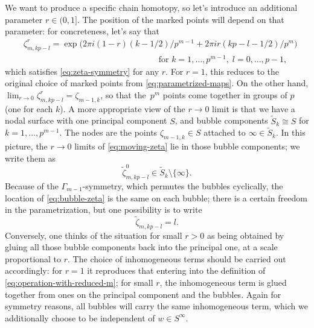 \documentclass[10pt,a4paper]{amsart}
\theoremstyle{plain}
\theoremstyle{definition}
\let\iso\cong
\begin{document}
We want to produce a specific chain homotopy, so let's introduce an additional parameter $r \in (0,1]$. The position of the marked points will depend on that parameter: for concreteness, let's say that\enlargethispage{-\baselineskip}
\begin{equation}\label{eq:moving-zeta}
\begin{aligned}
&\zeta_{m,kp-l}^r = \exp\bigl(2\pi i (1-r) (k-1/2)/p^{m-1} + 2\pi i r (kp-l-1/2)/p^m \bigr)
\\
& \qquad \qquad \qquad \qquad \qquad \qquad \qquad \qquad \text{for } k = 1,\dots,p^{m-1}, \; l = 0,\dots,p-1,
\end{aligned}
\end{equation}
which satisfies \eqref{eq:zeta-symmetry} for any $r$. For $r = 1$, this reduces to the original choice of marked points from \eqref{eq:parametrized-maps}. On the other hand, $\lim_{r \to 0} \zeta_{m,kp-l}^r = \zeta_{m-1,k}$, so that the~$p^m$ points come together in groups of $p$ (one for each $k$). A more appropriate view of the $r \to 0$ limit is that we have a nodal surface with one principal component $S$, and bubble components $\tilde{S}_k \iso S$ for $k = 1,\dots,p^{m-1}$. The nodes are the points $\zeta_{m-1,k} \in S$ attached to $\infty \in \tilde{S}_k$. In this picture, the $r \to 0$ limits of \eqref{eq:moving-zeta} lie in those bubble components; we write them as
\begin{equation}\label{eq:bubble-zeta}
\tilde\zeta_{m,kp-l}^0 \in \tilde{S}_k \setminus \{\infty\}.
\end{equation}
Because of the $\Gamma_{m-1}$-symmetry, which permutes the bubbles cyclically, the location of \eqref{eq:bubble-zeta} is the same on each bubble; there is a certain freedom in the parametrization, but one possibility is to write
\begin{equation}\label{eq:bubble-points}
\tilde\zeta_{m,kp-l} = l.
\end{equation}
Conversely, one thinks of the situation for small $r>0$ as being obtained by gluing all those bubble components back into the principal one, at a scale proportional to $r$. The choice of inhomogeneous terms should be carried out accordingly: for $r = 1$ it reproduces that entering into the definition of \eqref{eq:operation-with-reduced-m}; for small $r$, the inhomogeneous term is glued together from ones on the principal component and the bubbles. Again for symmetry reasons, all bubbles will carry the same inhomogeneous term, which we additionally choose to be independent of $w \in S^\infty$.
\end{document}
